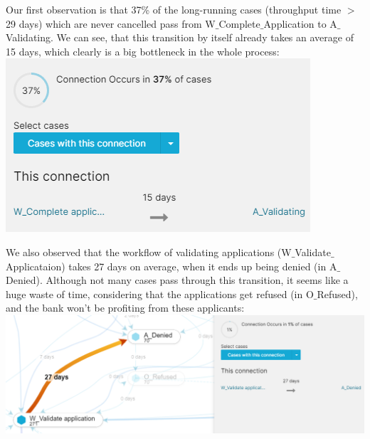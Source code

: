 \documentclass[../../main.tex]{subfiles}
\begin{document}
Our first observation is that 37\% of the long-running cases (throughput time $>$29 days) which are never cancelled pass from W$\_$Complete$\_$Application to A$\_$Validating. We can see, that this transition by itself already takes an average of 15 days, which clearly is a big bottleneck in the whole process:\\
\includegraphics[width=\textwidth]{img/QUESTION_5c_W_Complete.png}

We also observed that the workflow of validating applications (W$\_$Validate$\_$Applicataion) takes 27 days on average, when it ends up being denied (in A$\_$Denied). Although not many cases pass through this transition, it seems like a huge waste of time, considering that the applications get refused (in O$\_$Refused), and the bank won't be profiting from these applicants:\\
\includegraphics[width=\textwidth]{img/QUESTION_5c_W_Validate.png}
\end{document}
